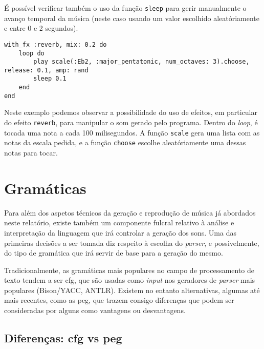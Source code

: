 É possível verificar também o uso da função \texttt{sleep} para gerir manualmente o avanço temporal da música (neste caso usando um valor escolhido aleatóriamente e entre 0 e 2 segundos).


\begin{lstlisting}[caption={Reproduzir um notas de uma escala aleatórias, com efeito \textit{reverb}}] 
with_fx :reverb, mix: 0.2 do
    loop do
        play scale(:Eb2, :major_pentatonic, num_octaves: 3).choose, release: 0.1, amp: rand
        sleep 0.1
    end
end
\end{lstlisting}
Neste exemplo podemos observar a possibilidade do uso de efeitos, em particular do efeito \texttt{reverb}, para manipular o som gerado pelo programa. Dentro do \textit{loop}, é tocada uma nota a cada 100 milisegundos. A função \texttt{scale} gera uma lista com as notas da escala pedida, e a função \texttt{choose} escolhe aleatóriamente uma dessas notas para tocar.
    
\section{Gramáticas}


Para além dos aspetos técnicos da geração e reprodução de música já abordados neste relatório, existe também um componente fulcral relativo à análise e interpretação da linguagem que irá controlar a geração dos sons. Uma das primeiras decisões a ser tomada diz respeito à escolha do \textit{parser}, e possivelmente, do tipo de gramática que irá servir de base para a geração do mesmo.

Tradicionalmente, as gramáticas mais populares no campo de processamento de texto tendem a ser \acrfull{cfg}, que são usadas como \textit{input} nos geradores de \textit{parser} mais populares (Bison/YACC, ANTLR). Existem no entanto alternativas, algumas até mais recentes, como as \acrfull{peg}, que trazem consigo diferenças que podem ser consideradas por alguns como vantagens ou desvantagens.

\subsection{Diferenças: \acrshort{cfg} vs \acrshort{peg}}

